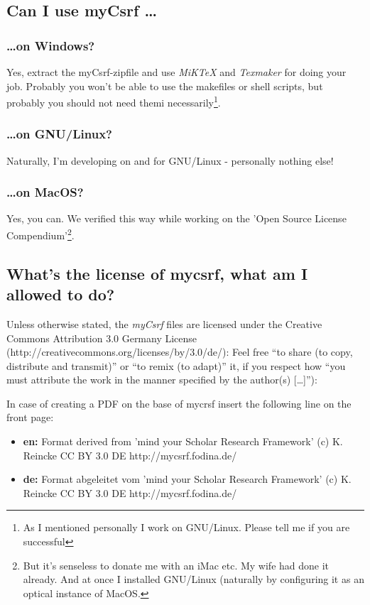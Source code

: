 \documentclass[
  DIV=calc,
  BCOR=5mm,
  11pt,
  headings=small,
  oneside,
  abstract=true,
  toc=bib,
  ngerman,english]{scrartcl}
\begin{document}
\subsection{Can I use myCsrf \ldots}
\subsubsection{\ldots on Windows?}
Yes, extract the myCsrf-zipfile and use \textit{MiKTeX} and
\textit{Texmaker} for doing your job. Probably you won't be able to use the
makefiles or shell scripts, but probably you should not need 
themi necessarily\footnote{As I mentioned
personally I work on GNU/Linux. Please tell me if you are successful}.

\subsubsection{\ldots on GNU/Linux?}
Naturally, I'm developing on and for GNU/Linux - personally nothing else!

\subsubsection{\ldots on MacOS?}
Yes, you can. We verified this way while working on the 'Open Source
License Compendium'\footnote{But it's senseless to donate me with an iMac etc.
My wife had done it already. And at once I installed GNU/Linux (naturally 
by configuring it as an
optical instance of MacOS.}.

\subsection{What's the license of mycsrf, what am I allowed to do?}

Unless otherwise stated, the \textit{myCsrf} files are licensed under the
Creative Commons Attribution 3.0 Germany License
(http://creativecommons.org/licenses/by/3.0/de/): Feel free \enquote{to share
(to copy, distribute and transmit)} or \enquote{to remix (to adapt)} it, if you
respect how \enquote{you must attribute the work in the manner specified by the
author(s) [\ldots]}):

In case of creating a PDF on the base of mycrsf insert the following line
on the front page:

\begin{itemize}
  \item \textbf{en:} Format derived from 'mind your Scholar Research Framework'
    (c) K. Reincke CC BY 3.0 DE http://mycsrf.fodina.de/
    \item \textbf{de:} Format abgeleitet vom 'mind your Scholar Research Framework'
    (c) K. Reincke CC BY 3.0 DE http://mycsrf.fodina.de/
\end{itemize}
\end{document}
